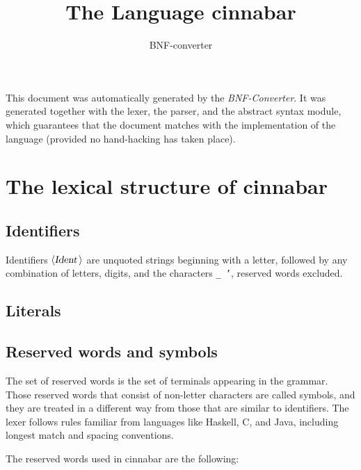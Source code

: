 \documentclass[a4paper,11pt]{article}
\author{BNF-converter}
\title{The Language cinnabar}
\begin{document}
\maketitle

\newcommand{\emptyP}{\mbox{$\epsilon$}}
\newcommand{\terminal}[1]{\mbox{{\texttt {#1}}}}
\newcommand{\nonterminal}[1]{\mbox{$\langle \mbox{{\sl #1 }} \! \rangle$}}
\newcommand{\arrow}{\mbox{::=}}
\newcommand{\delimit}{\mbox{$|$}}
\newcommand{\reserved}[1]{\mbox{{\texttt {#1}}}}
\newcommand{\literal}[1]{\mbox{{\texttt {#1}}}}
\newcommand{\symb}[1]{\mbox{{\texttt {#1}}}}

This document was automatically generated by the {\em BNF-Converter}. It was generated together with the lexer, the parser, and the abstract syntax module, which guarantees that the document matches with the implementation of the language (provided no hand-hacking has taken place).

\section*{The lexical structure of cinnabar}
\subsection*{Identifiers}
Identifiers \nonterminal{Ident} are unquoted strings beginning with a letter,
followed by any combination of letters, digits, and the characters {\tt \_ '},
reserved words excluded.


\subsection*{Literals}





\subsection*{Reserved words and symbols}
The set of reserved words is the set of terminals appearing in the grammar. Those reserved words that consist of non-letter characters are called symbols, and they are treated in a different way from those that are similar to identifiers. The lexer follows rules familiar from languages like Haskell, C, and Java, including longest match and spacing conventions.

The reserved words used in cinnabar are the following: \\
\end{document}
